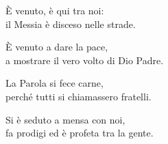 
\strofa È venuto, è qui tra noi:\\
il Messia è disceso nelle strade.

\spazio


\spazio

\strofa È venuto a dare la pace,\\
a mostrare il vero volto di Dio Padre.

\spazio


\spazio

\strofa La Parola si fece carne,\\
perché tutti si chiamassero fratelli.

\spazio


\spazio

\strofa Si è seduto a mensa con noi,\\
fa prodigi ed è profeta tra la gente.

\spazio

